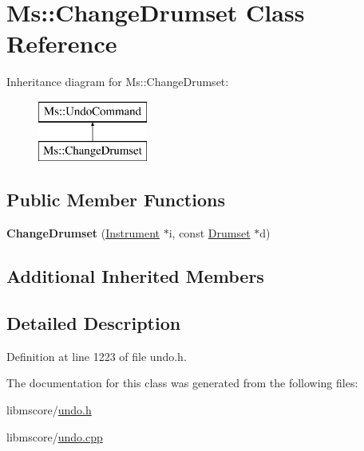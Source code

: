 \hypertarget{class_ms_1_1_change_drumset}{}\section{Ms\+:\+:Change\+Drumset Class Reference}
\label{class_ms_1_1_change_drumset}
Inheritance diagram for Ms\+:\+:Change\+Drumset\+:\begin{figure}[H]
\begin{center}
\leavevmode
\includegraphics[height=2.000000cm]{class_ms_1_1_change_drumset}
\end{center}
\end{figure}
\subsection*{Public Member Functions}
\begin{DoxyCompactItemize}
\item 
\mbox{\label{class_ms_1_1_change_drumset_a5d3af20e4bbeb4b24eb72e306e13497e}} 
{\bfseries Change\+Drumset} (\hyperlink{class_ms_1_1_instrument}{Instrument} $\ast$i, const \hyperlink{class_ms_1_1_drumset}{Drumset} $\ast$d)
\end{DoxyCompactItemize}
\subsection*{Additional Inherited Members}


\subsection{Detailed Description}


Definition at line 1223 of file undo.\+h.



The documentation for this class was generated from the following files\+:\begin{DoxyCompactItemize}
\item 
libmscore/\hyperlink{undo_8h}{undo.\+h}\item 
libmscore/\hyperlink{undo_8cpp}{undo.\+cpp}\end{DoxyCompactItemize}
